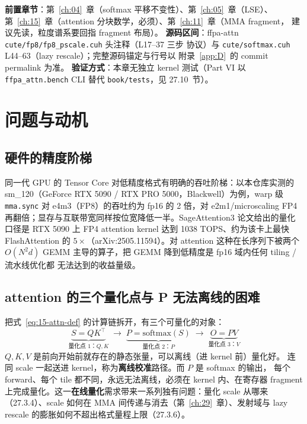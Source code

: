 \textbf{前置章节}：第~\ref{ch:04}~章（softmax 平移不变性）、第~\ref{ch:05}~章（LSE）、
第~\ref{ch:15}~章（attention 分块数学，必须）、第~\ref{ch:11}~章（MMA fragment，
建议先读，粒度谱系要回指 fragment 布局）。
\textbf{源码区间}：ffpa-attn \texttt{cute/fp8/fp8\_pscale.cuh} 头注释（L17--37 三步
协议）与 \texttt{cute/softmax.cuh} L44--63（lazy rescale）；完整源码锚定与行号以
附录~\ref{app:D}~的 commit permalink 为准。
\textbf{验证方式}：本章无独立 kernel 测试（Part VI 以
\texttt{ffpa\_attn.bench} CLI 替代 \texttt{book/tests}，见 27.10~节）。

\section{问题与动机}

\subsection{硬件的精度阶梯}

同一代 GPU 的 Tensor Core 对低精度格式有明确的吞吐阶梯：以本仓库实测的
sm\_120（GeForce RTX 5090 / RTX PRO 5000，Blackwell）为例，warp 级
\texttt{mma.sync} 对 e4m3（FP8）的吞吐约为 fp16 的 2 倍，对 e2m1/microscaling FP4
再翻倍；显存与互联带宽同样按位宽降低一半。SageAttention3 论文给出的量化口径是
RTX 5090 上 FP4 attention kernel 达到 1038 TOPS、约为该卡上最快 FlashAttention
的 $5\times$（arXiv:2505.11594）。对 attention 这种在长序列下被两个 $O(N^2 d)$
GEMM 主导的算子，把 GEMM 降到低精度是 fp16 域内任何 tiling / 流水线优化都
无法达到的收益量级。

\subsection{attention 的三个量化点与 P 无法离线的困难}

把式~\ref{eq:15-attn-def} 的计算链拆开，有三个可量化的对象：
\begin{equation}
  \underbrace{S = QK^{\top}}_{\text{量化点 1：}Q,K}
  \;\longrightarrow\;
  \underbrace{P = \mathrm{softmax}(S)}_{\text{量化点 2：}P}
  \;\longrightarrow\;
  \underbrace{O = PV}_{\text{量化点 3：}V}
\end{equation}
$Q,K,V$ 是前向开始前就存在的静态张量，可以离线（进 kernel 前）量化好。
连同 scale 一起送进 kernel，称为\textbf{离线校准}路径。而 $P$ 是 softmax 的输出，
每个 forward、每个 tile 都不同，永远无法离线，必须在 kernel 内、在寄存器
fragment 上完成量化。这一\textbf{在线量化}需求带来一系列独有问题：量化 scale 从哪来
（27.3.4）、scale 如何在 MMA 间传递与消去（第~\ref{ch:29}~章）、发射域与 lazy
rescale 的膨胀如何不超出格式量程上限（27.3.6）。

